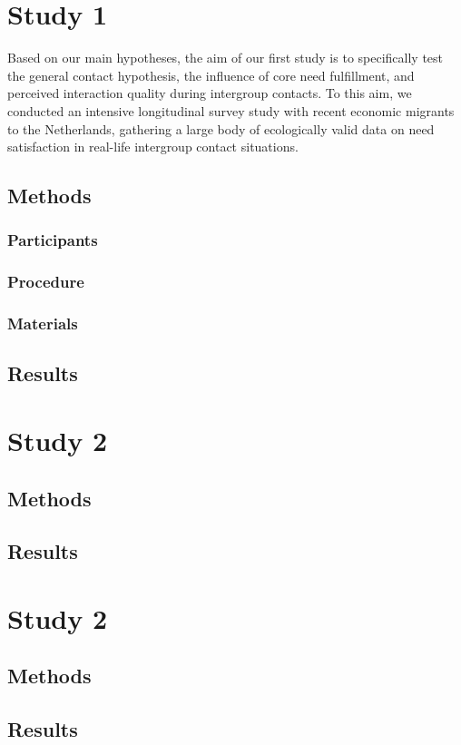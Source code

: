 \section{Study 1}

Based on our main hypotheses, the aim of our first study is to
specifically test the general contact hypothesis, the influence of core
need fulfillment, and perceived interaction quality during intergroup
contacts. To this aim, we conducted an intensive longitudinal survey
study with recent economic migrants to the Netherlands, gathering a
large body of ecologically valid data on need satisfaction in real-life
intergroup contact situations.

\subsection{Methods}

\subsubsection{Participants}

\subsubsection{Procedure}

\subsubsection{Materials}

\subsection{Results}

\section{Study 2}

\subsection{Methods}

\subsection{Results}

\section{Study 2}

\subsection{Methods}

\subsection{Results}
